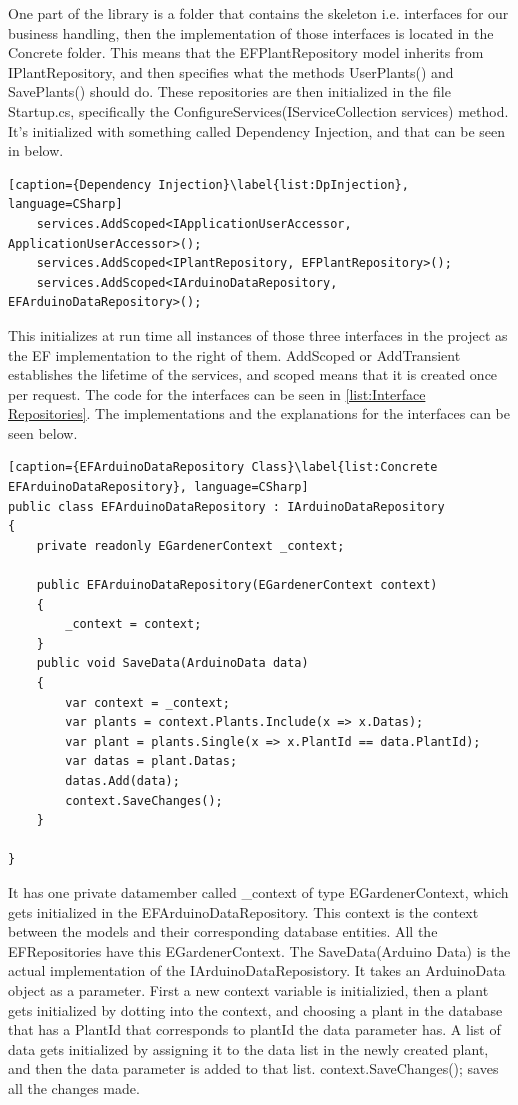 \documentclass[a4paper,12pt,twoside,openright,titlepage]{book}
\begin{document}
One part of the library is a folder that contains the skeleton i.e. interfaces for our business handling, then the implementation of those interfaces is located in the Concrete folder. This means that the EFPlantRepository model inherits from IPlantRepository, and then specifies what the methods UserPlants() and SavePlants() should do. These repositories are then initialized in the file Startup.cs, specifically the ConfigureServices(IServiceCollection services) method. It's initialized with something called Dependency Injection\href{https://docs.microsoft.com/en-us/aspnet/core/fundamentals/dependency-injection?view=aspnetcore-2.2}, and that can be seen in below.

\begin{lstlisting}[caption={Dependency Injection}\label{list:DpInjection}, language=CSharp]
	services.AddScoped<IApplicationUserAccessor, ApplicationUserAccessor>();
	services.AddScoped<IPlantRepository, EFPlantRepository>();
    services.AddScoped<IArduinoDataRepository, EFArduinoDataRepository>();
\end{lstlisting}

This initializes at run time all instances of those three interfaces in the project as the EF implementation to the right of them. AddScoped or AddTransient establishes the lifetime of the services, and scoped means that it is created once per request. The code for the interfaces can be seen in \ref{list:Interface Repositories}. The implementations and the explanations for the interfaces can be seen below.

\begin{lstlisting}[caption={EFArduinoDataRepository Class}\label{list:Concrete EFArduinoDataRepository}, language=CSharp]
public class EFArduinoDataRepository : IArduinoDataRepository
{
	private readonly EGardenerContext _context;
        
	public EFArduinoDataRepository(EGardenerContext context)
	{
        _context = context;
	}
	public void SaveData(ArduinoData data)
	{
		var context = _context;
		var plants = context.Plants.Include(x => x.Datas);
	    var plant = plants.Single(x => x.PlantId == data.PlantId);
        var datas = plant.Datas;
        datas.Add(data);
		context.SaveChanges();
	}

}
\end{lstlisting}

It has one private datamember called \_context of type EGardenerContext, which gets initialized in the EFArduinoDataRepository. This context is the context between the models and their corresponding database entities. All the EFRepositories have this EGardenerContext. The SaveData(Arduino Data) is the actual implementation of the IArduinoDataReposistory. It takes an ArduinoData object as a parameter. First a new context variable is initializied, then a plant gets initialized by dotting into the context, and choosing a plant in the database that has a PlantId that corresponds to plantId the data parameter has. A list of data gets initialized by assigning it to the data list in the newly created plant, and then the data parameter is added to that list. context.SaveChanges(); saves all the changes made.  
\end{document}
